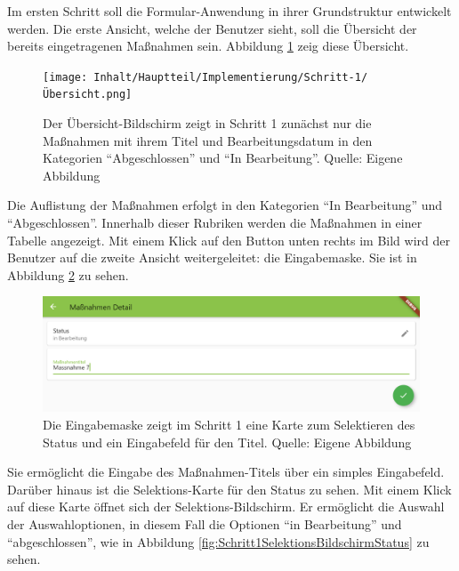 
Im ersten Schritt soll die Formular-Anwendung  in ihrer Grundstruktur entwickelt werden. Die erste Ansicht, welche der Benutzer sieht, soll die Übersicht der bereits eingetragenen Maßnahmen sein. Abbildung \ref{fig:Schritt1Uebersicht} zeig diese Übersicht.
\begin{figure}[H]
  \centering
  \texttt{[image: Inhalt/Hauptteil/Implementierung/Schritt-1/Übersicht.png]}
  \caption[Schritt 1 Übersicht]{Der Übersicht-Bildschirm zeigt in  Schritt 1 zunächst nur die Maßnahmen mit ihrem Titel und Bearbeitungsdatum in den Kategorien \enquote{Abgeschlossen} und \enquote{In Bearbeitung}. Quelle: Eigene Abbildung}
  \label{fig:Schritt1Uebersicht}
\end{figure}
Die Auflistung der Maßnahmen erfolgt in den Kategorien \enquote{In Bearbeitung} und \enquote{Abgeschlossen}. Innerhalb dieser Rubriken werden die Maßnahmen in einer Tabelle angezeigt. Mit einem Klick auf den Button unten rechts im Bild wird der Benutzer auf die zweite Ansicht weitergeleitet: die Eingabemaske. Sie ist in Abbildung \ref{fig:Schritt1Eingabemaske} zu sehen.
\begin{figure}[H]
  \centering
  \includegraphics[width=1.0\textwidth]{Inhalt/Hauptteil/Implementierung/Schritt-1/Eingabemaske.png}
  \caption[Schritt 1 Eingabemaske]{Die Eingabemaske zeigt im Schritt 1 eine Karte zum Selektieren des Status und ein Eingabefeld für den Titel. Quelle: Eigene Abbildung}
  \label{fig:Schritt1Eingabemaske}
\end{figure}
Sie ermöglicht die Eingabe des Maßnahmen-Titels über ein simples Eingabefeld. Darüber hinaus ist die Selektions-Karte für den Status zu sehen. Mit einem Klick auf diese Karte öffnet sich der Selektions-Bildschirm. Er ermöglicht die Auswahl der Auswahloptionen, in diesem Fall die Optionen \enquote{in Bearbeitung} und \enquote{abgeschlossen}, wie in Abbildung \ref{fig:Schritt1SelektionsBildschirmStatus} zu sehen.
